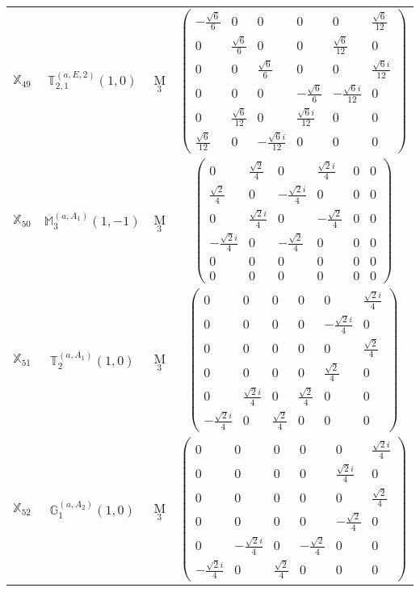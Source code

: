\documentclass[fleqn,10pt,landscape]{article}
\begin{document}
\begin{itemize}
\begin{center}
\begin{longtable}{c|c|c|c}
$ \mathbb{X}_{49} $ & $\mathbb{T}_{2,1}^{(a,E,2)}(1,0)$ & M$_{3}$ & $\begin{pmatrix} - \frac{\sqrt{6}}{6} & 0 & 0 & 0 & 0 & \frac{\sqrt{6}}{12} \\ 0 & \frac{\sqrt{6}}{6} & 0 & 0 & \frac{\sqrt{6}}{12} & 0 \\ 0 & 0 & \frac{\sqrt{6}}{6} & 0 & 0 & \frac{\sqrt{6} i}{12} \\ 0 & 0 & 0 & - \frac{\sqrt{6}}{6} & - \frac{\sqrt{6} i}{12} & 0 \\ 0 & \frac{\sqrt{6}}{12} & 0 & \frac{\sqrt{6} i}{12} & 0 & 0 \\ \frac{\sqrt{6}}{12} & 0 & - \frac{\sqrt{6} i}{12} & 0 & 0 & 0 \end{pmatrix}$ \\
$ \mathbb{X}_{50} $ & $\mathbb{M}_{3}^{(a,A_{1})}(1,-1)$ & M$_{3}$ & $\begin{pmatrix} 0 & \frac{\sqrt{2}}{4} & 0 & \frac{\sqrt{2} i}{4} & 0 & 0 \\ \frac{\sqrt{2}}{4} & 0 & - \frac{\sqrt{2} i}{4} & 0 & 0 & 0 \\ 0 & \frac{\sqrt{2} i}{4} & 0 & - \frac{\sqrt{2}}{4} & 0 & 0 \\ - \frac{\sqrt{2} i}{4} & 0 & - \frac{\sqrt{2}}{4} & 0 & 0 & 0 \\ 0 & 0 & 0 & 0 & 0 & 0 \\ 0 & 0 & 0 & 0 & 0 & 0 \end{pmatrix}$ \\
$ \mathbb{X}_{51} $ & $\mathbb{T}_{2}^{(a,A_{1})}(1,0)$ & M$_{3}$ & $\begin{pmatrix} 0 & 0 & 0 & 0 & 0 & \frac{\sqrt{2} i}{4} \\ 0 & 0 & 0 & 0 & - \frac{\sqrt{2} i}{4} & 0 \\ 0 & 0 & 0 & 0 & 0 & \frac{\sqrt{2}}{4} \\ 0 & 0 & 0 & 0 & \frac{\sqrt{2}}{4} & 0 \\ 0 & \frac{\sqrt{2} i}{4} & 0 & \frac{\sqrt{2}}{4} & 0 & 0 \\ - \frac{\sqrt{2} i}{4} & 0 & \frac{\sqrt{2}}{4} & 0 & 0 & 0 \end{pmatrix}$ \\
$ \mathbb{X}_{52} $ & $\mathbb{G}_{1}^{(a,A_{2})}(1,0)$ & M$_{3}$ & $\begin{pmatrix} 0 & 0 & 0 & 0 & 0 & \frac{\sqrt{2} i}{4} \\ 0 & 0 & 0 & 0 & \frac{\sqrt{2} i}{4} & 0 \\ 0 & 0 & 0 & 0 & 0 & \frac{\sqrt{2}}{4} \\ 0 & 0 & 0 & 0 & - \frac{\sqrt{2}}{4} & 0 \\ 0 & - \frac{\sqrt{2} i}{4} & 0 & - \frac{\sqrt{2}}{4} & 0 & 0 \\ - \frac{\sqrt{2} i}{4} & 0 & \frac{\sqrt{2}}{4} & 0 & 0 & 0 \end{pmatrix}$ \\ \hline

\end{longtable}
\end{center}
\end{itemize}
\end{document}
